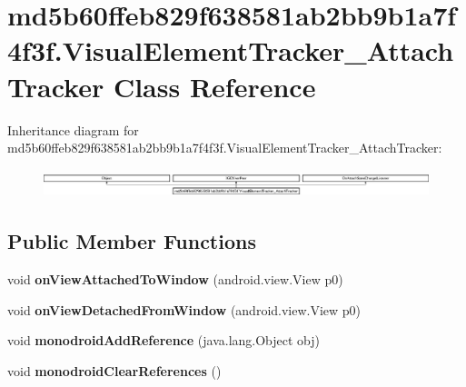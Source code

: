 \hypertarget{classmd5b60ffeb829f638581ab2bb9b1a7f4f3f_1_1VisualElementTracker__AttachTracker}{}\section{md5b60ffeb829f638581ab2bb9b1a7f4f3f.\+Visual\+Element\+Tracker\+\_\+\+Attach\+Tracker Class Reference}
\label{classmd5b60ffeb829f638581ab2bb9b1a7f4f3f_1_1VisualElementTracker__AttachTracker}
Inheritance diagram for md5b60ffeb829f638581ab2bb9b1a7f4f3f.\+Visual\+Element\+Tracker\+\_\+\+Attach\+Tracker\+:\begin{figure}[H]
\begin{center}
\leavevmode
\includegraphics[height=0.806336cm]{classmd5b60ffeb829f638581ab2bb9b1a7f4f3f_1_1VisualElementTracker__AttachTracker}
\end{center}
\end{figure}
\subsection*{Public Member Functions}
\begin{DoxyCompactItemize}
\item 
\mbox{\label{classmd5b60ffeb829f638581ab2bb9b1a7f4f3f_1_1VisualElementTracker__AttachTracker_ad14cce97063ca82046c9d85fe80f1557}} 
void {\bfseries on\+View\+Attached\+To\+Window} (android.\+view.\+View p0)
\item 
\mbox{\label{classmd5b60ffeb829f638581ab2bb9b1a7f4f3f_1_1VisualElementTracker__AttachTracker_aba4af8dd2c0947aedc8cdf3444295589}} 
void {\bfseries on\+View\+Detached\+From\+Window} (android.\+view.\+View p0)
\item 
\mbox{\label{classmd5b60ffeb829f638581ab2bb9b1a7f4f3f_1_1VisualElementTracker__AttachTracker_afdae8ddc75402aa21d5d750978d45de0}} 
void {\bfseries monodroid\+Add\+Reference} (java.\+lang.\+Object obj)
\item 
\mbox{\label{classmd5b60ffeb829f638581ab2bb9b1a7f4f3f_1_1VisualElementTracker__AttachTracker_aa7c289b9198727a036075508791a2563}} 
void {\bfseries monodroid\+Clear\+References} ()
\end{DoxyCompactItemize}
